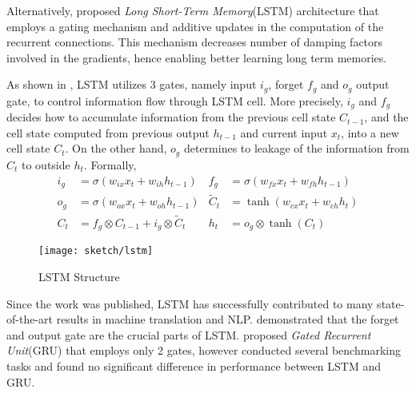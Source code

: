 Alternatively, \cite{HochreiterLongshorttermmemory1997} proposed \textit{Long Short-Term Memory}(LSTM) architecture that employs a gating mechanism and additive updates in the computation of the recurrent connections. This mechanism decreases number of damping factors involved in the gradients, hence enabling better learning long term memories.

As shown in \addfigure{\ref{fig:lstm_structure}}, LSTM utilizes 3 gates, namely input $i_g$, forget $f_g$ and $o_g$ output gate, to control  information flow through LSTM cell. More precisely, $i_g$ and $f_g$ decides how to accumulate information from the previous cell state $C_{t-1}$, and the cell state computed from previous output $h_{t-1}$ and current input $x_t$, into a new cell state $C_t$. On the other hand, $o_g$ determines to leakage of the information from $C_t$ to outside $h_t$. Formally, 
\begin{align}
	i_g &= \sigma( w_{ix} x_t + w_{ih} h_{t-1} )  &  	f_g &= \sigma( w_{fx} x_t + w_{fh} h_{t-1} )\\
	o_g &= \sigma( w_{ox} x_t + w_{oh} h_{t-1} ) & \widetilde{C}_t &= \tanh(w_{cx} x_t + w_{ch} h_t) \\
	C_t &= f_g \otimes C_{t-1} + i_g  \otimes  \widetilde{C}_t & h_{t} &= o_g \otimes \tanh(C_t)
\end{align}


\begin{figure}[h]
\centering
\texttt{[image: sketch/lstm]}
\caption{LSTM Structure} 

\label{fig:lstm_structure} 
\end{figure}

Since the work was published, LSTM has successfully contributed to many state-of-the-art results in machine translation and NLP\cite{MelisStateArtEvaluation2018}. \cite{GreffLSTMsearchspace2017} demonstrated that the forget and output gate are the crucial parts of LSTM.  \cite{ChoLearningPhraseRepresentations2014a} proposed \textit{Gated Recurrent Unit}(GRU) that employs only 2 gates, however \cite{Jozefowiczempiricalexplorationrecurrent2015a} conducted several benchmarking tasks and found no significant difference in performance between LSTM and GRU. 